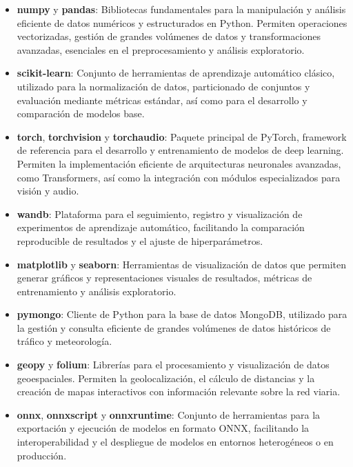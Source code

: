 \begin{itemize}
	\item \textbf{numpy} y \textbf{pandas}: Bibliotecas fundamentales para la manipulación y análisis eficiente de datos numéricos y estructurados en Python. Permiten operaciones vectorizadas, gestión de grandes volúmenes de datos y transformaciones avanzadas, esenciales en el preprocesamiento y análisis exploratorio.
	
	\item \textbf{scikit-learn}: Conjunto de herramientas de aprendizaje automático clásico, utilizado para la normalización de datos, particionado de conjuntos y evaluación mediante métricas estándar, así como para el desarrollo y comparación de modelos base.
	
	\item \textbf{torch}, \textbf{torchvision} y \textbf{torchaudio}: Paquete principal de PyTorch, framework de referencia para el desarrollo y entrenamiento de modelos de deep learning. Permiten la implementación eficiente de arquitecturas neuronales avanzadas, como Transformers, así como la integración con módulos especializados para visión y audio.
	
	\item \textbf{wandb}: Plataforma para el seguimiento, registro y visualización de experimentos de aprendizaje automático, facilitando la comparación reproducible de resultados y el ajuste de hiperparámetros.
	
	\item \textbf{matplotlib} y \textbf{seaborn}: Herramientas de visualización de datos que permiten generar gráficos y representaciones visuales de resultados, métricas de entrenamiento y análisis exploratorio.
	
	\item \textbf{pymongo}: Cliente de Python para la base de datos MongoDB, utilizado para la gestión y consulta eficiente de grandes volúmenes de datos históricos de tráfico y meteorología.
	
	\item \textbf{geopy} y \textbf{folium}: Librerías para el procesamiento y visualización de datos geoespaciales. Permiten la geolocalización, el cálculo de distancias y la creación de mapas interactivos con información relevante sobre la red viaria.
	
	\item \textbf{onnx}, \textbf{onnxscript} y \textbf{onnxruntime}: Conjunto de herramientas para la exportación y ejecución de modelos en formato ONNX, facilitando la interoperabilidad y el despliegue de modelos en entornos heterogéneos o en producción.
	

\end{itemize}

